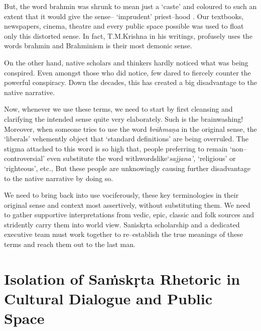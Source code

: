 But, the word brahmin was shrunk to mean just a ‘caste’ and coloured to such an extent that it would give the sense– ‘imprudent’ priest–hood . Our textbooks, newspapers, cinema, theatre and every public space possible was used to float only this distorted sense. In fact, T.M.Krishna in his writings, profusely uses the words brahmin and Brahminism is their most demonic sense.

On the other hand, native scholars and thinkers hardly noticed what was being conspired. Even amongst those who did notice, few dared to fiercely counter the powerful conspiracy. Down the decades, this has created a big disadvantage to the native narrative.

Now, whenever we use these terms, we need to start by first cleansing and clarifying the intended sense quite very elaborately. Such is the brainwashing! Moreover, when someone tries to use the word \textit{brāhmaṇa} in the original sense, the ‘liberals’ vehemently object that ‘standard definitions’ are being overruled. The stigma attached to this word is so high that, people preferring to remain ‘non–controversial’ even substitute the word withwordslike‘\textit{sajjana’,} ‘religious’ or ‘righteous’, etc., But these people are unknowingly causing further disadvantage to the native narrative by doing so.

We need to bring back into use vociferously, these key terminologies in their original sense and context most assertively, without substituting them. We need to gather supportive interpretations from vedic, epic, classic and folk sources and stridently carry them into world view. Saṁskṛta scholarship and a dedicated executive team must work together to re–establish the true meanings of these terms and reach them out to the last man.


\section*{Isolation of Saṁskṛta Rhetoric in Cultural Dialogue and Public Space}

